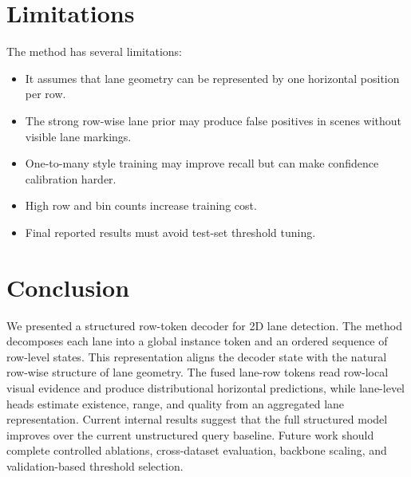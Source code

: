 \documentclass[conference]{IEEEtran}
\begin{document}
\section{Limitations}

The method has several limitations:

\begin{itemize}
    \item It assumes that lane geometry can be represented by one horizontal position per row.
    \item The strong row-wise lane prior may produce false positives in scenes without visible lane markings.
    \item One-to-many style training may improve recall but can make confidence calibration harder.
    \item High row and bin counts increase training cost.
    \item Final reported results must avoid test-set threshold tuning.
\end{itemize}

\section{Conclusion}

We presented a structured row-token decoder for 2D lane detection. The method decomposes each lane into a global instance token and an ordered sequence of row-level states. This representation aligns the decoder state with the natural row-wise structure of lane geometry. The fused lane-row tokens read row-local visual evidence and produce distributional horizontal predictions, while lane-level heads estimate existence, range, and quality from an aggregated lane representation. Current internal results suggest that the full structured model improves over the current unstructured query baseline. Future work should complete controlled ablations, cross-dataset evaluation, backbone scaling, and validation-based threshold selection.
\end{document}
